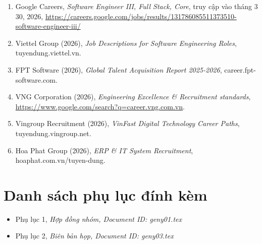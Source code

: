 \documentclass[12pt,a4paper]{article}
\begin{document}
\begin{sloppypar}
\begin{enumerate}
    \item Google Careers, \textit{Software Engineer III, Full Stack, Core}, truy cập vào tháng 3 30, 2026, \url{https://careers.google.com/jobs/results/131786085511373510-software-engineer-iii/}
    \item Viettel Group (2026), \textit{Job Descriptions for Software Engineering Roles}, tuyendung.viettel.vn.
    \item FPT Software (2026), \textit{Global Talent Acquisition Report 2025-2026}, career.fpt-software.com.
    \item VNG Corporation (2026), \textit{Engineering Excellence \& Recruitment standards}, \url{https://www.google.com/search?q=career.vng.com.vn}.
    \item Vingroup Recruitment (2026), \textit{VinFast Digital Technology Career Paths}, tuyendung.vingroup.net.
    \item Hoa Phat Group (2026), \textit{ERP \& IT System Recruitment}, hoaphat.com.vn/tuyen-dung.
\end{enumerate}
\end{sloppypar}

\section{Danh sách phụ lục đính kèm}
\begin{itemize}
    \item Phụ lục 1, \textit{Hợp đồng nhóm, Document ID: geny01.tex} 
    \item Phụ lục 2, \textit{Biên bản họp, Document ID: geny03.tex} 
\end{itemize}

\label{LastPageMain} 
\end{document}
